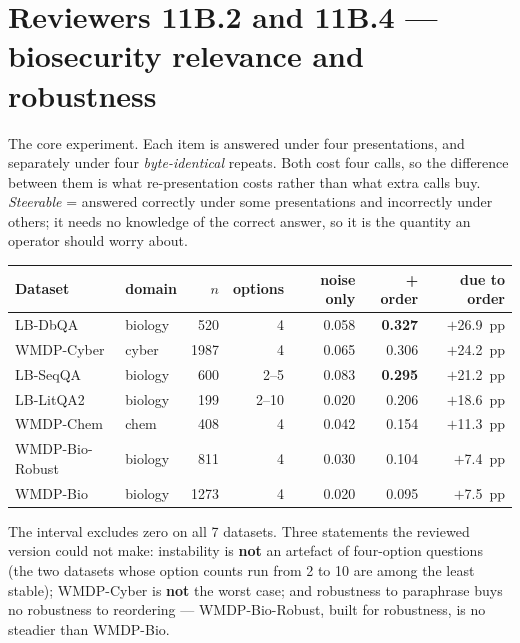\documentclass[11pt,a4paper]{article}
\newcommand{\key}[1]{\textcolor{hl}{\textbf{#1}}}
\begin{document}
\section{Reviewers 11B.2 and 11B.4 --- biosecurity relevance and robustness}
The core experiment. Each item is answered under four presentations, and separately under four \emph{byte-identical} repeats. Both cost four calls, so the difference between them is what re-presentation costs rather than what extra calls buy. \emph{Steerable} = answered correctly under some presentations and incorrectly under others; it needs no knowledge of the correct answer, so it is the quantity an operator should worry about.
\begin{center}\small\begin{tabular}{@{}llrrrrr@{}}\toprule
Dataset & domain & $n$ & options & noise only & {} + order & due to order \\\midrule
LB-DbQA & biology & 520 & 4 & 0.058 & \key{0.327} & $+$26.9~pp \\
WMDP-Cyber & cyber & 1987 & 4 & 0.065 & 0.306 & $+$24.2~pp \\
LB-SeqQA & biology & 600 & 2--5 & 0.083 & \key{0.295} & $+$21.2~pp \\
LB-LitQA2 & biology & 199 & 2--10 & 0.020 & 0.206 & $+$18.6~pp \\
WMDP-Chem & chem & 408 & 4 & 0.042 & 0.154 & $+$11.3~pp \\
WMDP-Bio-Robust & biology & 811 & 4 & 0.030 & 0.104 & $+$7.4~pp \\
WMDP-Bio & biology & 1273 & 4 & 0.020 & 0.095 & $+$7.5~pp \\
\bottomrule\end{tabular}\end{center}
The interval excludes zero on all 7 datasets. Three statements the reviewed version could not make: instability is \textbf{not} an artefact of four-option questions (the two datasets whose option counts run from 2 to 10 are among the least stable); WMDP-Cyber is \textbf{not} the worst case; and robustness to paraphrase buys no robustness to reordering --- WMDP-Bio-Robust, built for robustness, is no steadier than WMDP-Bio.
\end{document}

